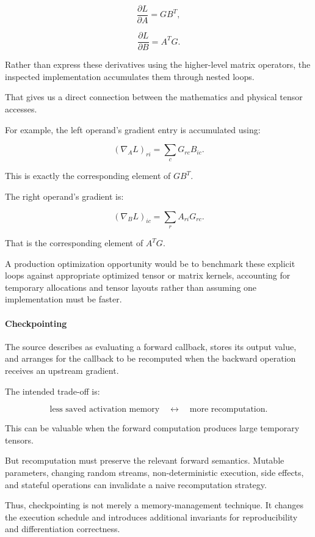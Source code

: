 \[
\frac{\partial L}{\partial A}=GB^T,
\]

\[
\frac{\partial L}{\partial B}=A^TG.
\]

Rather than express these derivatives using the higher-level matrix operators, the inspected implementation accumulates them through nested loops.

That gives us a direct connection between the mathematics and physical tensor accesses.

For example, the left operand's gradient entry is accumulated using:

\[
(\nabla_A L)_{ri} = \sum_cG_{rc}B_{ic}.
\]

This is exactly the corresponding element of \(GB^T\).

The right operand's gradient is:

\[
(\nabla_B L)_{ic} = \sum_rA_{ri}G_{rc}.
\]

That is the corresponding element of \(A^TG\).

A production optimization opportunity would be to benchmark these explicit loops against appropriate optimized tensor or matrix kernels, accounting for temporary allocations and tensor layouts rather than assuming one implementation must be faster.

\paragraph{Checkpointing}\label{02-foundations-ii-ch022-checkpointing}

\hypertarget{02-foundations-ii-ch022-checkpointing}{}

The source describes  as evaluating a forward callback, stores its output value, and arranges for the callback to be recomputed when the backward operation receives an upstream gradient.

The intended trade-off is:

\[
\text{less saved activation memory} \quad\longleftrightarrow\quad \text{more recomputation}.
\]

This can be valuable when the forward computation produces large temporary tensors.

But recomputation must preserve the relevant forward semantics. Mutable parameters, changing random streams, non-deterministic execution, side effects, and stateful operations can invalidate a naive recomputation strategy.

Thus, checkpointing is not merely a memory-management technique. It changes the execution schedule and introduces additional invariants for reproducibility and differentiation correctness.

